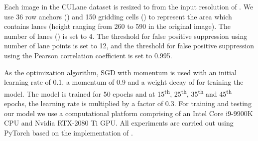 \documentclass[conference]{IEEEtran}
\begin{document}
Each image in the CULane dataset is resized to  from the input resolution of . We use 36 row anchors () and 150 gridding cells () to represent the area which contains lanes (height ranging from 260 to 590 in the original image). The number of lanes () is set to 4. The threshold for false positive suppression using number of lane points is set to 12, and the threshold for false positive suppression using the Pearson correlation coefficient is set to 0.995.

As the optimization algorithm, SGD with momentum \cite{pmlr-v28-sutskever13} is used with an initial learning rate of 0.1, a momentum of 0.9 and a weight decay of  for training the model. The model is trained for 50 epochs and at 15\textsuperscript{th}, 25\textsuperscript{th}, 35\textsuperscript{th} and 45\textsuperscript{th} epochs, the learning rate is multiplied by a factor of 0.3. For training and testing our model we use a computational platform comprising of an Intel Core i9-9900K CPU and Nvidia RTX-2080 Ti GPU. All experiments are carried out using PyTorch\cite{paszke2017automatic} based on the implementation of \cite{qin2020ultra}.
\end{document}
